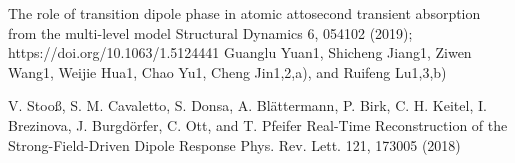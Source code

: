 
The role of transition dipole phase in atomic attosecond transient absorption from the multi-level model 
Structural Dynamics 6, 054102 (2019); https://doi.org/10.1063/1.5124441 
Guanglu Yuan1, Shicheng Jiang1, Ziwen Wang1,  Weijie Hua1, Chao Yu1,  Cheng Jin1,2,a), and  Ruifeng Lu1,3,b)

V. Stooß, S. M. Cavaletto, S. Donsa, A. Blättermann, P. Birk, C. H. Keitel, I. Brezinova, J. Burgdörfer, C. Ott, and T. Pfeifer
Real-Time Reconstruction of the Strong-Field-Driven Dipole Response
Phys. Rev. Lett. 121, 173005 (2018)
